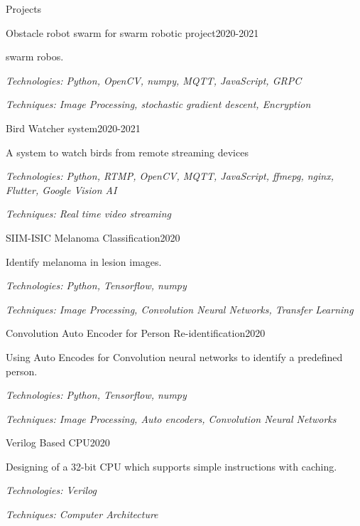\documentclass{resume} %
\begin{document}
\begin{rSection}{Projects}

\begin{rSubsection}{Obstacle robot swarm for swarm robotic project}{2020-2021}{}{}
\item swarm robos. \item 
\textit{Technologies: Python, OpenCV, numpy, MQTT, JavaScript, GRPC}
\item \textit{Techniques: Image Processing, stochastic gradient descent, Encryption }
\end{rSubsection}

\begin{rSubsection}{Bird Watcher system}{2020-2021}{}{}
\item A system to watch birds from remote streaming devices \item 
\textit{Technologies: Python, RTMP, OpenCV, MQTT, JavaScript, ffmepg, nginx, Flutter, Google Vision AI}
\item \textit{Techniques: Real time video streaming}
\end{rSubsection}

\begin{rSubsection}{SIIM-ISIC Melanoma Classification}{2020}{}{}
\item Identify melanoma in lesion images. \item 
\textit{Technologies: Python, Tensorflow, numpy}
\item \textit{Techniques: Image Processing, Convolution Neural Networks, Transfer Learning }
\end{rSubsection}

\begin{rSubsection}{Convolution Auto Encoder for Person Re-identification}{2020}{}{}
\item Using Auto Encodes for Convolution neural networks to identify a predefined person. \item 
\textit{Technologies: Python, Tensorflow, numpy}
\item \textit{Techniques: Image Processing, Auto encoders, Convolution Neural Networks}
\end{rSubsection}


\begin{rSubsection}{Verilog Based CPU}{2020}{}{}
\item Designing of a 32-bit CPU which supports simple instructions with caching. \item 
\textit{Technologies: Verilog}
\item \textit{Techniques: Computer Architecture }
\end{rSubsection}



\end{rSection}
\end{document}
